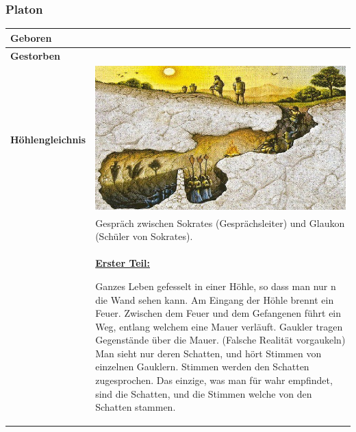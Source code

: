 		\subsubsection{Platon}
			\begin{longtable}{>{\bfseries}p{}p{}}
				\hline
				Geboren
					& \\
				\hline
				Gestorben
					& \\
				\hline
				Höhlengleichnis
					& \vspace{0pt}
					
						\includegraphics[scale=0.4]{./pictures/hoehlengleichnis.jpeg}\\
					& Gespräch zwischen Sokrates (Gesprächsleiter) und Glaukon (Schüler von Sokrates).\\
					& \textbf{\underline{Erster Teil:}}\newline
						
						Ganzes Leben gefesselt in einer Höhle, so dass man nur n die Wand sehen kann.\newline
						Am Eingang der Höhle brennt ein Feuer.
						Zwischen dem Feuer und dem Gefangenen führt ein Weg, entlang welchem eine Mauer verläuft.\newline
						Gaukler tragen Gegenstände über die Mauer. (Falsche Realität vorgaukeln)\newline
						Man sieht nur deren Schatten, und hört Stimmen von einzelnen Gauklern.\newline
						Stimmen werden den Schatten zugesprochen.\newline
						Das einzige, was man für wahr empfindet, sind die Schatten, und die Stimmen welche von den Schatten stammen.\newline
						

\end{longtable}
